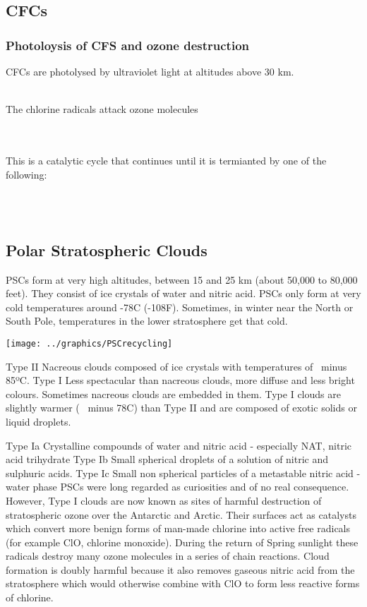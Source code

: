 \documentclass[ignorenonframetext]{beamer}
\begin{document}
\subsection{CFCs}
\begin{frame}
\frametitle{Photoloysis of CFS and ozone destruction}
CFCs are photolysed by ultraviolet light at altitudes above 30 km.

\hfill\\
\medskip The chlorine radicals attack ozone molecules\newline

\hfill\\
\hfill\\
\medskip This is a catalytic cycle that continues until it is termianted by one of the following:

\medskip {}\hfill\\
\medskip {}\hfill\\
\end{frame}

\subsection{Polar Stratospheric Clouds}
\begin{frame}
PSCs form at very high altitudes, between 15 and 25 km (about 50,000 to 80,000 feet). They consist of ice crystals of water and nitric acid. PSCs only form at very cold temperatures around -78C (-108F). Sometimes, in winter near the North or South Pole, temperatures in the lower stratosphere get that cold. 

\texttt{[image: ../graphics/PSCrecycling]}
\end{frame}

Type II
Nacreous clouds composed of ice crystals with temperatures of ~minus 85ºC.
Type I
Less spectacular than nacreous clouds, more diffuse and less bright colours. Sometimes nacreous clouds are embedded in them. Type I clouds are slightly warmer (~ minus 78C) than Type II and are composed of exotic solids or liquid droplets.

Type Ia
Crystalline compounds of water and nitric acid - especially NAT, nitric acid trihydrate 
Type Ib
Small spherical droplets of a solution of nitric and sulphuric acids.
Type Ic
Small non spherical particles of a metastable nitric acid - water phase
PSCs were long regarded as curiosities and of no real consequence. However, Type I clouds are now known as sites of harmful destruction of stratospheric ozone over the Antarctic and Arctic. Their surfaces act as catalysts which convert more benign forms of man-made chlorine into active free radicals (for example ClO, chlorine monoxide). During the return of Spring sunlight these radicals destroy many ozone molecules in a series of chain reactions. Cloud formation is doubly harmful because it also removes gaseous nitric acid from the stratosphere which would otherwise combine with ClO to form less reactive forms of chlorine.
\end{document}
